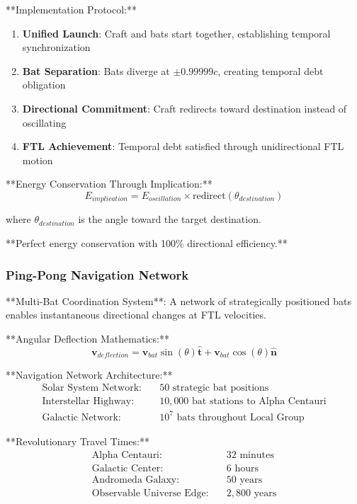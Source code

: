 \documentclass[12pt,a4paper]{article}
\theoremstyle{remark}
\begin{document}
**Implementation Protocol:**
\begin{enumerate}
\item \textbf{Unified Launch}: Craft and bats start together, establishing temporal synchronization
\item \textbf{Bat Separation}: Bats diverge at $\pm 0.99999c$, creating temporal debt obligation
\item \textbf{Directional Commitment}: Craft redirects toward destination instead of oscillating
\item \textbf{FTL Achievement}: Temporal debt satisfied through unidirectional FTL motion
\end{enumerate}

**Energy Conservation Through Implication:**
\begin{equation}
E_{implication} = E_{oscillation} \times \text{redirect}(\theta_{destination})
\end{equation}

where $\theta_{destination}$ is the angle toward the target destination.

**Perfect energy conservation with 100\% directional efficiency.**

\subsubsection{Ping-Pong Navigation Network}

**Multi-Bat Coordination System**: A network of strategically positioned bats enables instantaneous directional changes at FTL velocities.

**Angular Deflection Mathematics:**
\begin{equation}
\mathbf{v}_{deflection} = \mathbf{v}_{bat} \sin(\theta) \hat{\mathbf{t}} + \mathbf{v}_{bat} \cos(\theta) \hat{\mathbf{n}}
\end{equation}

**Navigation Network Architecture:**
\begin{align}
\text{Solar System Network:} &\quad 50 \text{ strategic bat positions} \\
\text{Interstellar Highway:} &\quad 10,000 \text{ bat stations to Alpha Centauri} \\
\text{Galactic Network:} &\quad 10^7 \text{ bats throughout Local Group}
\end{align}

**Revolutionary Travel Times:**
\begin{align}
\text{Alpha Centauri:} &\quad 32 \text{ minutes} \\
\text{Galactic Center:} &\quad 6 \text{ hours} \\
\text{Andromeda Galaxy:} &\quad 50 \text{ years} \\
\text{Observable Universe Edge:} &\quad 2,800 \text{ years}
\end{align}
\end{document}
